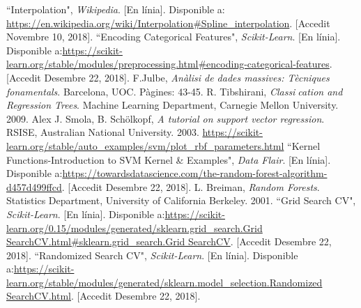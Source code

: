 \documentclass[10pt,a4paper,twocolumn,twoside]{article}
\begin{document}
\begin{thebibliography}{11}
 ``Interpolation", \textit{Wikipedia}. [En línia]. Disponible a: \url{https://en.wikipedia.org/wiki/Interpolation#Spline_interpolation}. [Accedit Novembre 10, 2018].
``Encoding Categorical Features", \textit{Scikit-Learn}. [En línia]. Disponible a:\url{https://scikit-learn.org/stable/modules/preprocessing.html#encoding-categorical-features}. [Accedit Desembre 22, 2018].
F.Julbe, \textit{Anàlisi de dades massives: Tècniques fonamentals}. Barcelona, UOC. Pàgines: 43-45.
R. Tibshirani, \textit{Classication and Regression Trees}. Machine Learning Department, Carnegie Mellon University. 2009.
Alex J. Smola, B. Schölkopf, \textit{A tutorial on support vector regression}. RSISE, Australian National University. 2003.
\url{https://scikit-learn.org/stable/auto_examples/svm/plot_rbf_parameters.html}
``Kernel Functions-Introduction to SVM Kernel \& Examples", \textit{Data Flair}. [En línia]. Disponible a:\url{https://towardsdatascience.com/the-random-forest-algorithm-d457d499ffcd}. [Accedit Desembre 22, 2018].
L. Breiman, \textit{Random Forests}. Statistics Department, University of California Berkeley. 2001.
``Grid Search CV", \textit{Scikit-Learn}. [En línia]. Disponible a:\url{https://scikit-learn.org/0.15/modules/generated/sklearn.grid_search.Grid SearchCV.html#sklearn.grid_search.Grid SearchCV}. [Accedit Desembre 22, 2018].
``Randomized Search CV", \textit{Scikit-Learn}. [En línia]. Disponible a:\url{https://scikit-learn.org/stable/modules/generated/sklearn.model_selection.Randomized SearchCV.html}. [Accedit Desembre 22, 2018].

\end{thebibliography}
\clearpage
\end{document}
